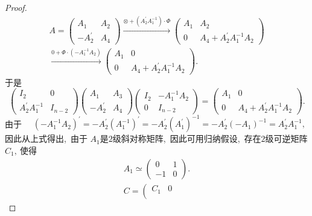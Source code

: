 \begin{proof}
	$$\begin{array}{l} 
		A=\left(\begin{array}{cc}
			A_{1} & A_{2} \\
			-A_{2}^{\prime} & A_{4}
		\end{array}\right) \stackrel{\otimes+\left(A_{2}^{\prime} A_{1}^{-1}\right) \cdot \Phi}{\longrightarrow}\left(\begin{array}{cc}
			A_{1} & A_{2} \\
			0 & A_{4}+A_{2}^{\prime} A_{1}^{-1} A_{2}
		\end{array}\right) \\
		\stackrel{0+\Phi \cdot\left(-A_{1}^{-1} A_{2}\right)}{\longrightarrow}\left(\begin{array}{cc}
			A_{1} & 0 \\
			0 & A_{4}+A_{2}^{\prime} A_{1}^{-1} A_{2}
		\end{array}\right) .
	\end{array}$$
	于是
	$$\left(\begin{array}{cc}
		I_{2} & 0 \\
		A_{2}^{\prime} A_{1}^{-1} & I_{n-2}
	\end{array}\right)\left(\begin{array}{cc}
		A_{1} & A_{3} \\
		-A_{2}^{\prime} & A_{4}
	\end{array}\right)\left(\begin{array}{cc}
		I_{2} & -A_{1}^{-1} A_{2} \\
		0 & I_{n-2}
	\end{array}\right)=\left(\begin{array}{cc}
		A_{1} & 0 \\
		0 & A_{4}+A_{2}^{\prime} A_{1}^{-1} A_{2}
	\end{array}\right) .$$
	由于  $\quad\left(-A_{1}^{-1} A_{2}\right)^{\prime}=-A_{2}^{\prime}\left(A_{1}^{-1}\right)^{\prime}=-A_{2}^{\prime}\left(A_{1}^{\prime}\right)^{-1}=-A_{2}^{\prime}\left(-A_{1}\right)^{-1}=A_{2}^{\prime} A_{1}^{-1} ,\ $ 因此从上式得出,\ 
	由于  $A_{1} $是$ 2 $级斜对称矩阵,\  因此可用归纳假设,\  存在$ 2 $级可逆矩阵 $ C_{1} ,\  $使得
	$$\begin{array}{l}
		A_{1} \simeq\left(\begin{array}{cc}
			0 & 1 \\
			-1 & 0
		\end{array}\right) . \\
		C=\left(\begin{array}{cc}
			C_{1} & 0 \\

\end{array}
\end{array}$$
\end{proof}
